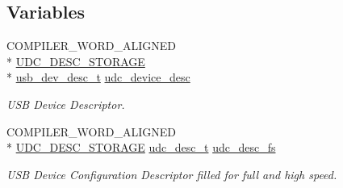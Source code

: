 \subsection*{Variables}
\begin{DoxyCompactItemize}
\item 
\hypertarget{group__udi__cdc__group__single__desc_ga9b0e293c7d3236bf90c42d808c2bc1ab}{C\-O\-M\-P\-I\-L\-E\-R\-\_\-\-W\-O\-R\-D\-\_\-\-A\-L\-I\-G\-N\-E\-D \\*
\hyperlink{group__udc__desc__group_gae086959cec07a2e71ab069e25a51764f}{U\-D\-C\-\_\-\-D\-E\-S\-C\-\_\-\-S\-T\-O\-R\-A\-G\-E} \\*
\hyperlink{structusb__dev__desc__t}{usb\-\_\-dev\-\_\-desc\-\_\-t} \hyperlink{group__udi__cdc__group__single__desc_ga9b0e293c7d3236bf90c42d808c2bc1ab}{udc\-\_\-device\-\_\-desc}}\label{group__udi__cdc__group__single__desc_ga9b0e293c7d3236bf90c42d808c2bc1ab}

\begin{DoxyCompactList}\small\item\em U\-S\-B Device Descriptor. \end{DoxyCompactList}\item 
C\-O\-M\-P\-I\-L\-E\-R\-\_\-\-W\-O\-R\-D\-\_\-\-A\-L\-I\-G\-N\-E\-D \\*
\hyperlink{group__udc__desc__group_gae086959cec07a2e71ab069e25a51764f}{U\-D\-C\-\_\-\-D\-E\-S\-C\-\_\-\-S\-T\-O\-R\-A\-G\-E} \hyperlink{structudc__desc__t}{udc\-\_\-desc\-\_\-t} \hyperlink{group__udi__cdc__group__single__desc_ga694cd2202d59a342c2ed2e50f427a932}{udc\-\_\-desc\-\_\-fs}
\begin{DoxyCompactList}\small\item\em U\-S\-B Device Configuration Descriptor filled for full and high speed. \end{DoxyCompactList}\end{DoxyCompactItemize}
